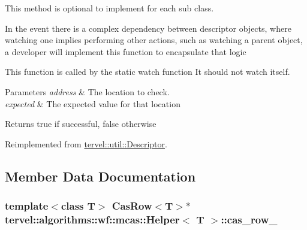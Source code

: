 This method is optional to implement for each sub class. 

In the event there is a complex dependency between descriptor objects, where watching one implies performing other actions, such as watching a parent object, a developer will implement this function to encapsulate that logic

This function is called by the static watch function It should not watch itself.


\begin{DoxyParams}{Parameters}
{\em address} & The location to check. \\
\hline
{\em expected} & The expected value for that location\\
\hline
\end{DoxyParams}
\begin{DoxyReturn}{Returns}
true if successful, false otherwise 
\end{DoxyReturn}


Reimplemented from \hyperlink{classtervel_1_1util_1_1_descriptor_ab643e09f20f35149dc820766b0f9ccdb}{tervel\+::util\+::\+Descriptor}.



\subsection{Member Data Documentation}
\hypertarget{classtervel_1_1algorithms_1_1wf_1_1mcas_1_1_helper_a1dc09a369e400a1d0dc37e505b585932}{}
\subsubsection[{cas\+\_\+row\+\_\+}]{\setlength{\rightskip}{0pt plus 5cm}template$<$class T$>$ {\bf Cas\+Row}$<$T$>$$\ast$ {\bf tervel\+::algorithms\+::wf\+::mcas\+::\+Helper}$<$ T $>$\+::cas\+\_\+row\+\_\+\hspace{0.3cm}{\ttfamily [private]}}\label{classtervel_1_1algorithms_1_1wf_1_1mcas_1_1_helper_a1dc09a369e400a1d0dc37e505b585932}
\hypertarget{classtervel_1_1algorithms_1_1wf_1_1mcas_1_1_helper_a50a2eb6601553b9110c408f7981b7f15}{}
